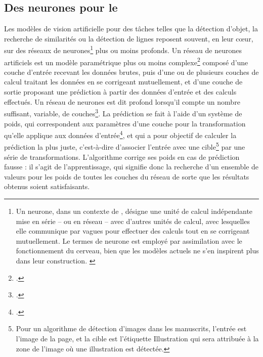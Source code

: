 
	\subsection{Des \og neurones \fg pour le \dl}
	Les modèles de vision artificielle pour des tâches telles que la détection d'objet, la recherche de similarités ou la détection de lignes reposent souvent, en leur cœur, sur des réseaux de neurones\footnote{Un neurone, dans un contexte de \ml, désigne une unité de calcul indépendante mise en série -- ou en réseau -- avec d'autres unités de calcul, avec lesquelles elle communique par vagues pour effectuer des calculs tout en se corrigeant mutuellement. Le termes de \og neurone \fg est employé par assimilation avec le fonctionnement du cerveau, bien que les modèles actuels ne s'en inspirent plus dans leur construction. \cite{azencottIntroductionAuMachine2018}} plus ou moins profonds. Un réseau de neurones artificiels est un modèle paramétrique plus ou moins complexe\footcite{azencottIntroductionAuMachine2018} composé d'une couche d'entrée recevant les données brutes, puis d'une ou de plusieurs couches de calcul traitant les données en se corrigeant mutuellement, et d'une couche de sortie proposant une prédiction à partir des données d'entrée et des calculs effectués. Un réseau de neurones est dit \og profond \fg lorsqu'il compte un nombre suffisant, variable, de couches\footcite{azencottIntroductionAuMachine2018}. La prédiction se fait à l'aide d'un système de poids, qui correspondent aux paramètres d'une couche pour la transformation qu'elle applique aux données d'entrée\footcite{cholletApprentissageProfondAvec2020a}, et qui a pour objectif de calculer la prédiction la plus juste, c'est-à-dire d'associer l'entrée avec une cible\footnote{Pour un algorithme de détection d'images dans les manuscrits, l'entrée est l'image de la page, et la cible est l'étiquette \og Illustration \fg qui sera attribuée à la zone de l'image où une illustration est détectée.} par une série de transformations. L'algorithme corrige ses poids en cas de prédiction fausse : il s'agit de l'apprentissage, qui signifie donc la recherche d'un ensemble de valeurs pour les poids de toutes les couches du réseau de sorte que les résultats obtenus soient satisfaisants.
    
